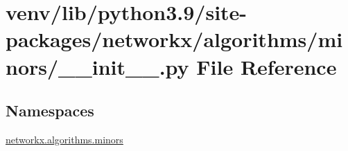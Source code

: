 \hypertarget{venv_2lib_2python3_89_2site-packages_2networkx_2algorithms_2minors_2____init_____8py}{}\section{venv/lib/python3.9/site-\/packages/networkx/algorithms/minors/\+\_\+\+\_\+init\+\_\+\+\_\+.py File Reference}
\label{venv_2lib_2python3_89_2site-packages_2networkx_2algorithms_2minors_2____init_____8py}
\subsection*{Namespaces}
\begin{DoxyCompactItemize}
\item 
 \hyperlink{namespacenetworkx_1_1algorithms_1_1minors}{networkx.\+algorithms.\+minors}
\end{DoxyCompactItemize}
